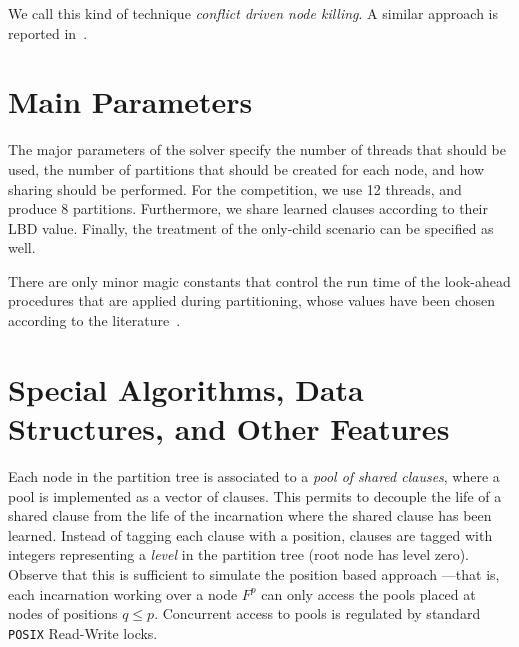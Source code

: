 \documentclass[conference]{IEEEtran}
\newcommand{\dnote}[1]{$[$\textcolor{darkred}{davide}:~~\emph{\textcolor{midgrey}{#1}}$]$\marginpar{$\blacksquare$}}
\newcommand{\1}{x_1}
\newcommand{\2}{x_2}
\newcommand{\3}{x_3}
\newcommand{\4}{x_4}
\newcommand{\5}{x_5}
\newcommand{\6}{x_6}
\newcommand{\7}{x_7}
\newcommand{\8}{x_8}
\newcommand{\9}{x_9}
\begin{document}
We call this kind of technique \emph{conflict driven node killing}. 
A similar approach is reported in~\cite{HJN11}.

\section{Main Parameters}

The major parameters of the solver specify the number of threads that should be used, the number of partitions that should be created for each node, and how sharing should be performed. 
For the competition, we use 12 threads, and produce 8 partitions. Furthermore, we share learned clauses according to their LBD value. 
Finally, the treatment of the only-child scenario can be specified as well. 

There are only minor magic constants that control the run time of the look-ahead procedures that are applied during partitioning, whose values have been chosen according to the literature~\cite{HvM09HBSAT}. 


\section{Special Algorithms, Data Structures, and Other Features}

Each node in the partition tree is associated to a \emph{pool of shared clauses}, where a pool is implemented as a vector of clauses. 
This permits to decouple the life of a shared clause from the life of the incarnation where the shared clause has been learned. 
Instead of tagging each clause with a position, clauses are tagged with integers representing a \emph{level} in the partition tree 
(root node has level zero). Observe that this is sufficient to simulate the position based approach ---that is, each incarnation working over a node $F^p$ can only access the pools placed at nodes of positions $q \le p$. 
Concurrent access to pools is regulated by standard \verb|POSIX| Read-Write locks. 
\end{document}
